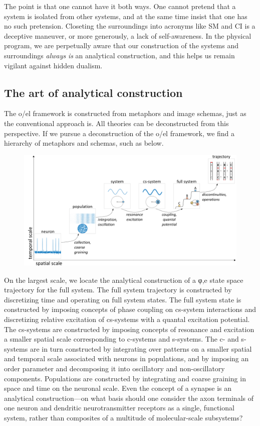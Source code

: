   The point is that one cannot have it both ways. One cannot pretend that a system is isolated from other systems, and at the same time insist that one has no such pretension. Closeting the surroundings into acronyms like SM and CI is a deceptive maneuver, or more generously, a lack of self-awareness. In the physical program, we are perpetually aware that our construction of the systems and surroundings \textit{always} \textit{is} an analytical construction, and this helps us remain vigilant against hidden dualism.

\subsection{The art of analytical construction}

The o/el framework is constructed from metaphors and image schemas, just as the conventional approach is. All theories can be deconstructed from this perspective. If we pursue a deconstruction of the o/el framework, we find a hierarchy of metaphors and schemas, such as below. 

  
\begin{figure}
\includegraphics[width=\textwidth]{figures/Tilsen-img169.png}
\caption{\missingcaption}
\label{fig:}
\end{figure}
 

  On the largest scale, we locate the analytical construction of a φ,e state space trajectory for the full system. The full system trajectory is constructed by discretizing time and operating on full system states. The full system state is constructed by imposing concepts of phase coupling on cs-system interactions and discretizing relative excitation of cs-systems with a quantal excitation potential. The cs-systems are constructed by imposing concepts of resonance and excitation a smaller spatial scale corresponding to c-systems and s-systems. The c- and s-systems are in turn constructed by integrating over patterns on a smaller spatial and temporal scale associated with neurons in populations, and by imposing an order parameter and decomposing it into oscillatory and non-oscillatory components. Populations are constructed by integrating and coarse graining in space and time on the neuronal scale. Even the concept of a synapse is an analytical construction—on what basis should one consider the axon terminals of one neuron and dendritic neurotransmitter receptors as a single, functional system, rather than composites of a multitude of molecular-scale subsystems? 

